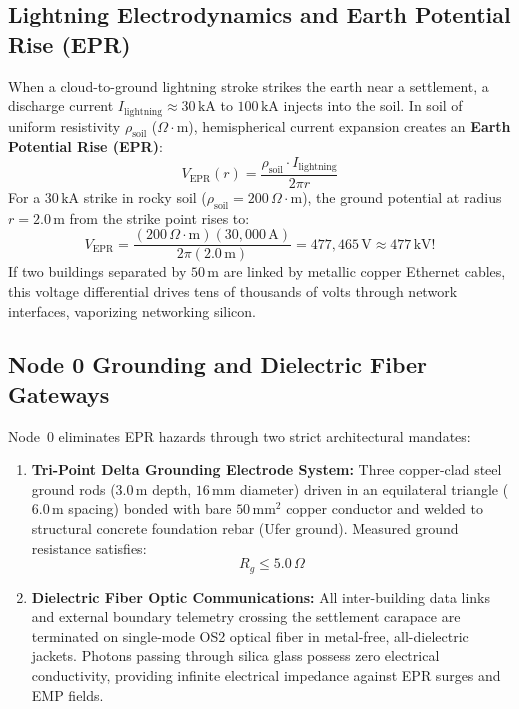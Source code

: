 \subsection{Lightning Electrodynamics and Earth Potential Rise (EPR)}
When a cloud-to-ground lightning stroke strikes the earth near a settlement, a discharge current $I_{\mathrm{lightning}} \approx 30\,\mathrm{kA}$ to $100\,\mathrm{kA}$ injects into the soil. In soil of uniform resistivity $\rho_{\mathrm{soil}}$ ($\Omega\cdot\mathrm{m}$), hemispherical current expansion creates an \textbf{Earth Potential Rise (EPR)}:
\begin{equation}
V_{\mathrm{EPR}}(r) = \frac{\rho_{\mathrm{soil}} \cdot I_{\mathrm{lightning}}}{2 \pi r}
\label{eq:epr_potential}
\end{equation}
For a $30\,\mathrm{kA}$ strike in rocky soil ($\rho_{\mathrm{soil}} = 200\,\Omega\cdot\mathrm{m}$), the ground potential at radius $r = 2.0\,\mathrm{m}$ from the strike point rises to:
\begin{equation}
V_{\mathrm{EPR}} = \frac{(200\,\Omega\cdot\mathrm{m})(30,000\,\mathrm{A})}{2 \pi (2.0\,\mathrm{m})} = 477,465\,\mathrm{V} \approx 477\,\mathrm{kV}!
\label{eq:epr_calc_example}
\end{equation}
If two buildings separated by $50\,\mathrm{m}$ are linked by metallic copper Ethernet cables, this voltage differential drives tens of thousands of volts through network interfaces, vaporizing networking silicon.

\subsection{Node 0 Grounding and Dielectric Fiber Gateways}
Node~0 eliminates EPR hazards through two strict architectural mandates:
\begin{enumerate}
    \item \textbf{Tri-Point Delta Grounding Electrode System:} Three copper-clad steel ground rods ($3.0\,\mathrm{m}$ depth, $16\,\mathrm{mm}$ diameter) driven in an equilateral triangle ($6.0\,\mathrm{m}$ spacing) bonded with bare $50\,\mathrm{mm^2}$ copper conductor and welded to structural concrete foundation rebar (Ufer ground). Measured ground resistance satisfies:
    \begin{equation}
    R_g \le 5.0\,\Omega
    \label{eq:ground_resistance_target}
    \end{equation}
    \item \textbf{Dielectric Fiber Optic Communications:} All inter-building data links and external boundary telemetry crossing the settlement carapace are terminated on single-mode OS2 optical fiber in metal-free, all-dielectric jackets. Photons passing through silica glass possess zero electrical conductivity, providing infinite electrical impedance against EPR surges and EMP fields.
\end{enumerate}

